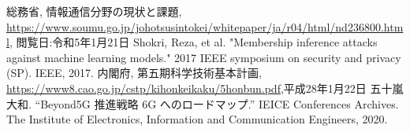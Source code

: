 \documentclass[10.5pt,a4j,dvipdfmx,openany]{jsbook}
\begin{document}
\begin{thebibliography}{9}
総務省, 情報通信分野の現状と課題, \url{https://www.soumu.go.jp/johotsusintokei/whitepaper/ja/r04/html/nd236800.html}, 閲覧日:令和5年1月21日
Shokri, Reza, et al. "Membership inference attacks against machine learning models." 2017 IEEE symposium on security and privacy (SP). IEEE, 2017.
内閣府, 第五期科学技術基本計画, \url{https://www8.cao.go.jp/cstp/kihonkeikaku/5honbun.pdf},平成28年1月22日
五十嵐大和. ``Beyond5G 推進戦略 6G へのロードマップ.'' IEICE Conferences Archives. The Institute of Electronics, Information and Communication Engineers, 2020. 
\end{thebibliography}
\end{document}
